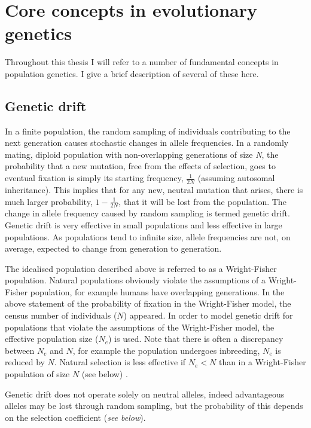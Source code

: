\section[Core concepts]{Core concepts in evolutionary genetics}

	Throughout this thesis I will refer to a number of fundamental concepts in population genetics. I give a brief description of several of these here.

\subsection{Genetic drift}

	In a finite population, the random sampling of individuals contributing to the next generation causes stochastic changes in allele frequencies. In a randomly mating, diploid population with non-overlapping generations of size \textit{N}, the probability that a new mutation, free from the effects of selection, goes to eventual fixation is simply its starting frequency, $\frac{1}{2N}$ (assuming autosomal inheritance). This implies that for any new, neutral mutation that arises, there is much larger probability, $1 - \frac{1}{2N}$, that it will be lost from the population. The change in allele frequency caused by random sampling is termed genetic drift. Genetic drift is very effective in small populations and less effective in large populations. As populations tend to infinite size, allele frequencies are not, on average, expected to change from generation to generation.
	
	The idealised population described above is referred to as a Wright-Fisher population. Natural populations obviously violate the assumptions of a Wright-Fisher population, for example humans have overlapping generations. In the above statement of the probability of fixation in the Wright-Fisher model, the census number of individuals ($N$) appeared. In order to model genetic drift for populations that violate the assumptions of the Wright-Fisher model, the effective population size ($N_e$) is used. Note that there is often a discrepancy between $N_e$ and $N$, for example the population undergoes inbreeding, $N_e$ is reduced by $N$. Natural selection is less effective if $N_e < N$ than in a Wright-Fisher population of size $N$ (see below) \cite{RN110}.

	Genetic drift does not operate solely on neutral alleles, indeed advantageous alleles may be lost through random sampling, but the probability of this depends on the selection coefficient (\textit{see below}).
	
